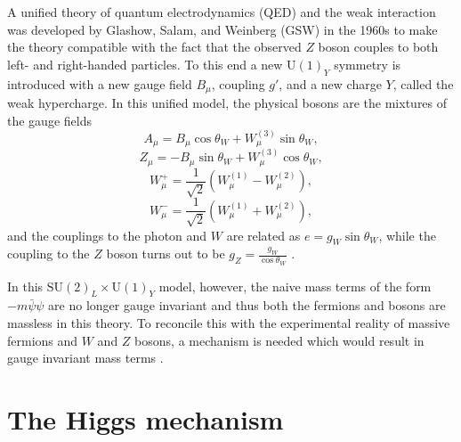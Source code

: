 A unified theory of quantum electrodynamics (QED) and the weak interaction was developed
by Glashow, Salam, and Weinberg (GSW) in the 1960s \cite{Thomson:2013zua} to make the
theory compatible with the fact that the observed $Z$ boson couples to both left- and
right-handed particles. To this end a new $\text{U}(1)_Y$ symmetry is introduced with a new gauge
field $B_\mu$, coupling $g'$, and a new charge $Y$, called the weak hypercharge. In this unified model,
the physical bosons are the mixtures of the gauge fields
\begin{equation}
A_\mu = B_\mu \cos\theta_W + W_\mu^{(3)} \sin{\theta_W},
\end{equation}
\begin{equation}
Z_\mu = - B_\mu \sin{\theta_W} + W_\mu^{(3)} \cos{\theta_W},
\end{equation}
\begin{equation}
W^+_\mu = \frac{1}{\sqrt{2}}\left( W_\mu^{(1)} - W_\mu^{(2)} \right),
\end{equation}
\begin{equation}
W^-_\mu = \frac{1}{\sqrt{2}}\left( W_\mu^{(1)} + W_\mu^{(2)} \right),
\end{equation}
and the couplings to the photon and $W$ are related as $e = g_W \sin{\theta_W}$,
while the coupling to the $Z$ boson turns out to be $g_Z  = \frac{g_W}{\cos{\theta_W}}$ \cite{Thomson:2013zua}.

In this $\text{SU}(2)_L \times \text{U}(1)_Y$ model, however, the naive mass terms of the form $-m\bar\psi\psi$
are no longer gauge invariant and thus both the fermions and bosons are massless in this theory.
To reconcile this with the experimental reality of massive fermions and $W$ and $Z$ bosons, a
mechanism is needed which would result in gauge invariant mass terms \cite{Thomson:2013zua}.

\section{The Higgs mechanism}

